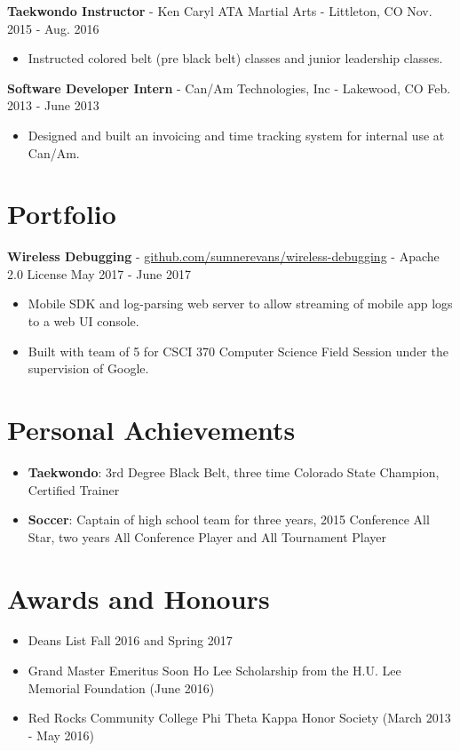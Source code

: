 \documentclass[10.5pt,letterpaper]{article}
\begin{document}
\vspace{4pt}
\textbf{Taekwondo Instructor} - Ken Caryl ATA Martial Arts - Littleton, CO
\hfill Nov. 2015 - Aug. 2016
\begin{itemize}
    \item Instructed colored belt (pre black belt) classes and junior leadership
        classes.
\end{itemize}

\vspace{4pt}
\textbf{Software Developer Intern} - Can/Am Technologies, Inc - Lakewood, CO
\hfill Feb. 2013 - June 2013
\begin{itemize}
    \item Designed and built an invoicing and time tracking system for internal
        use at Can/Am.
\end{itemize}

\section*{Portfolio}
\textbf{Wireless Debugging} -
\href{https://github.com/sumnerevans/wireless-debugging}{github.com/sumnerevans/wireless-debugging}
- Apache 2.0 License \hfill May 2017 - June 2017
\begin{itemize}
    \item Mobile SDK and log-parsing web server to allow streaming of mobile app
        logs to a web UI console.
    \item Built with team of 5 for CSCI 370 Computer Science Field Session under
        the supervision of Google.
\end{itemize}

\section*{Personal Achievements}
\begin{itemize}
    \item \textbf{Taekwondo}: 3rd Degree Black Belt, three time Colorado State
        Champion, Certified Trainer
    \item \textbf{Soccer}: Captain of high school team for three years, 2015
        Conference All Star, two years All Conference Player and All Tournament
        Player
\end{itemize}

\section*{Awards and Honours}
\begin{itemize}
    \item Deans List Fall 2016 and Spring 2017
    \item Grand Master Emeritus Soon Ho Lee Scholarship from the H.U. Lee
        Memorial Foundation (June 2016)
    \item Red Rocks Community College Phi Theta Kappa Honor Society (March 2013
        - May 2016)
\end{itemize}
\end{document}
